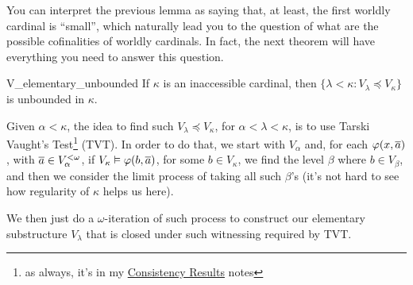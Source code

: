 You can interpret the previous lemma as saying that, at least, the first worldly cardinal is ``small'', which naturally lead you to the question of what are the possible cofinalities of worldly cardinals. In fact, the next theorem will have everything you need to answer this question.

\begin{theorem}{}{V_elementary_unbounded}
    If $\kappa$ is an inaccessible cardinal, then $\{\lambda<\kappa:V_\lambda\preceq V_\kappa\}$ is unbounded in $\kappa$.
\end{theorem}

\begin{sketch}
    Given $\alpha<\kappa$, the idea to find such $V_\lambda\preceq V_\kappa$, for $\alpha<\lambda<\kappa$, is to use Tarski Vaught's Test\footnote{as always, it's in my \href{https://github.com/Xennonio/Consistency-Results}{Consistency Results} notes} (TVT). In order to do that, we start with $V_\alpha$ and, for each $\varphi(x,\overline{a})$, with $\overline{a}\in V_\alpha^{<\omega}$, if $V_\kappa\vDash\varphi(b,\overline{a})$, for some $b\in V_\kappa$, we find the level $\beta$ where $b\in V_\beta$, and then we consider the limit process of taking all such $\beta$'s (it's not hard to see how regularity of $\kappa$ helps us here).

    We then just do a $\omega$-iteration of such process to construct our elementary substructure $V_\lambda$ that is closed under such witnessing required by TVT.
\end{sketch}

